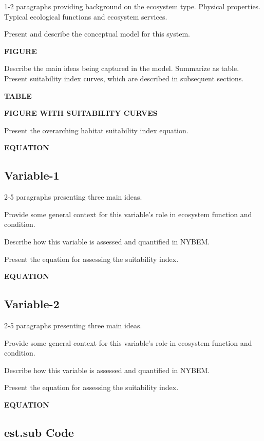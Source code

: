 \documentclass[
]{book}
\begin{document}
1-2 paragraphs providing background on the ecosystem type. Physical properties. Typical ecological functions and ecosystem services.

Present and describe the conceptual model for this system.

\textbf{FIGURE}

Describe the main ideas being captured in the model. Summarize as table. Present suitability index curves, which are described in subsequent sections.

\textbf{TABLE}

\textbf{FIGURE WITH SUITABILITY CURVES}

Present the overarching habitat suitability index equation.

\textbf{EQUATION}

\hypertarget{variable-1-3}{%
\subsection{Variable-1}\label{variable-1-3}}

2-5 paragraphs presenting three main ideas.

Provide some general context for this variable's role in ecosystem function and condition.

Describe how this variable is assessed and quantified in NYBEM.

Present the equation for assessing the suitability index.

\textbf{EQUATION}

\hypertarget{variable-2-1}{%
\subsection{Variable-2}\label{variable-2-1}}

2-5 paragraphs presenting three main ideas.

Provide some general context for this variable's role in ecosystem function and condition.

Describe how this variable is assessed and quantified in NYBEM.

Present the equation for assessing the suitability index.

\textbf{EQUATION}

\hypertarget{est.sub-code}{%
\subsection{est.sub Code}\label{est.sub-code}}
\end{document}

